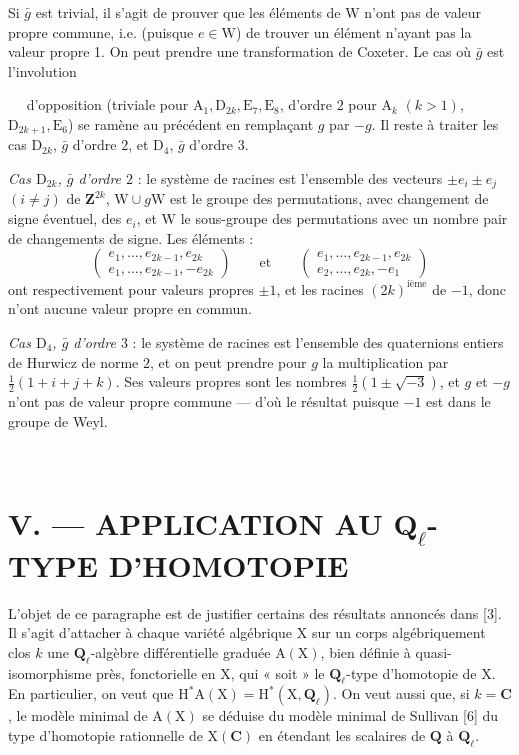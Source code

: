 \documentclass[11pt,leqno]{article}
\newcommand{\Page}[1]{\ifvmode\noindent\else\unskip\ \fi{\footnotesize\textcolor{gray}{[p.\,#1]}}\ \ignorespaces}
\begin{document}
Si \(\bar{g}\) est trivial, il s’agit de prouver que les éléments de \(\mathrm{W}\) n’ont pas de valeur propre commune, i.e. (puisque \(e\in\mathrm{W}\)) de trouver un élément n’ayant pas la valeur propre 1. On peut prendre une transformation de Coxeter. Le cas où \(\bar{g}\) est l’involution

\Page{233}
d’opposition (triviale pour \(\mathrm{A}_1,\mathrm{D}_{2k},\mathrm{E}_7,\mathrm{E}_8\), d’ordre \(2\) pour \(\mathrm{A}_k\) \((k>1)\), \(\mathrm{D}_{2k+1},\mathrm{E}_6\)) se ramène au précédent en remplaçant \(g\) par \(-g\). Il reste à traiter les cas \(\mathrm{D}_{2k}\), \(\bar g\) d’ordre \(2\), et \(\mathrm{D}_4\), \(\bar g\) d’ordre \(3\).

\textit{Cas \(\mathrm{D}_{2k}\), \(\bar g\) d’ordre \(2\)} : le système de racines est l’ensemble des vecteurs \(\pm e_i\pm e_j\) \((i\ne j)\) de \(\mathbf{Z}^{2k}\), \(\mathrm{W}\cup g\mathrm{W}\) est le groupe des permutations, avec changement de signe éventuel, des \(e_i\), et \(\mathrm{W}\) le sous-groupe des permutations avec un nombre pair de changements de signe. Les éléments :
\[
\left(
\begin{array}{l}
e_1,\ldots,e_{2k-1},e_{2k}\\
e_1,\ldots,e_{2k-1},-e_{2k}
\end{array}
\right)
\qquad\text{et}\qquad
\left(
\begin{array}{l}
e_1,\ldots,e_{2k-1},e_{2k}\\
e_2,\ldots,e_{2k},-e_1
\end{array}
\right)
\]
ont respectivement pour valeurs propres \(\pm1\), et les racines \((2k)^{\text{ième}}\) de \(-1\), donc n’ont aucune valeur propre en commun.

\textit{Cas \(\mathrm{D}_4\), \(\bar g\) d’ordre \(3\)} : le système de racines est l’ensemble des quaternions entiers de Hurwicz de norme \(2\), et on peut prendre pour \(g\) la multiplication par \(\frac{1}{2}(1+i+j+k)\). Ses valeurs propres sont les nombres \(\frac{1}{2}(1\pm\sqrt{-3})\), et \(g\) et \(-g\) n’ont pas de valeur propre commune — d’où le résultat puisque \(-1\) est dans le groupe de Weyl.

\Page{234}
\section*{\normalfont V. — APPLICATION AU \(\mathbf{Q}_{\ell}\)-TYPE D’HOMOTOPIE}

L’objet de ce paragraphe est de justifier certains des résultats annoncés dans [3]. Il s’agit d’attacher à chaque variété algébrique \(\mathrm{X}\) sur un corps algébriquement clos \(k\) une \(\mathbf{Q}_{\ell}\)-algèbre différentielle graduée \(\mathrm{A}(\mathrm{X})\), bien définie à quasi-isomorphisme près, fonctorielle en \(\mathrm{X}\), qui « soit » le \(\mathbf{Q}_{\ell}\)-type d’homotopie de \(\mathrm{X}\). En particulier, on veut que \(\mathrm{H}^*\mathrm{A}(\mathrm{X})=\mathrm{H}^*(\mathrm{X},\mathbf{Q}_{\ell})\). On veut aussi que, si \(k=\mathbf{C}\), le modèle minimal de \(\mathrm{A}(\mathrm{X})\) se déduise du modèle minimal de Sullivan [6] du type d’homotopie rationnelle de \(\mathrm{X}(\mathbf{C})\) en étendant les scalaires de \(\mathbf{Q}\) à \(\mathbf{Q}_{\ell}\).
\end{document}

